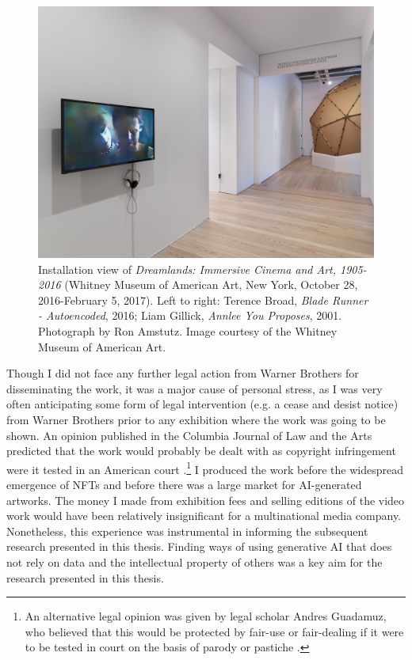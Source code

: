 \begin{figure}[!htb]
    \centering
    \captionsetup{justification=centering}
    \includegraphics[width=1\textwidth]{figures/c1_intro/whitney-installation-shot.png}
    \caption[Installation view of \textit{Blade Runner --- Autoencoded} at the Whitney Museum of American Art]{Installation view of \textit{Dreamlands: Immersive Cinema and Art, 1905-2016} (Whitney Museum of American Art, New York, October 28, 2016-February 5, 2017). Left to right: Terence Broad, \textit{Blade Runner - Autoencoded}, 2016; Liam Gillick, \textit{Annlee You Proposes}, 2001. Photograph by Ron Amstutz. Image courtesy of the Whitney Museum of American Art.}
    \label{fig:c1:blade-runner-whitney}
\end{figure}

Though I did not face any further legal action from Warner Brothers for  disseminating the work, it was a major cause of personal stress, as I was very often anticipating some form of legal intervention (e.g. a cease and desist notice) from Warner Brothers prior to any exhibition where the work was going to be shown.
An opinion published in the Columbia Journal of Law and the Arts predicted that the work would probably be dealt with as copyright infringement were it tested in an American court \citep{sobel2017artificial}.\footnote{An alternative legal opinion was given by legal scholar Andres Guadamuz, who believed that this would be protected by fair-use or fair-dealing if it were to be tested in court on the basis of parody or pastiche \citep{guadamuz2024personal}.} 
I produced the work before the widespread emergence of NFTs and before there was a large market for AI-generated artworks. 
The money I made from exhibition fees and selling editions of the video work would have been relatively insignificant for a multinational media company. 
Nonetheless, this experience was instrumental in informing the subsequent research presented in this thesis. 
Finding ways of using generative AI that does not rely on data and the intellectual property of others was a key aim for the research presented in this thesis.


